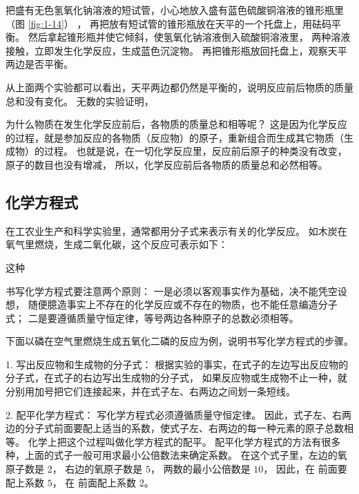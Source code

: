 \begin{shiyan}
    把盛有无色氢氧化钠溶液的短试管，小心地放入盛有蓝色硫酸铜溶液的锥形瓶里（图 \ref{fig:1-14}） ，
    再把放有短试管的锥形瓶放在天平的一个托盘上，用砝码平衡。
    然后拿起锥形瓶并使它倾斜，使氢氧化钠溶液倒入硫酸铜溶液里，
    两种溶液接触，立即发生化学反应，生成蓝色沉淀物。
    再把锥形瓶放回托盘上，观察天平两边是否平衡。
\end{shiyan}

从上面两个实验都可以看出，天平两边都仍然是平衡的，说明反应前后物质的质量总和没有变化。
无数的实验证明，

为什么物质在发生化学反应前后，各物质的质量总和相等呢？
这是因为化学反应的过程，就是参加反应的各物质（反应物）的原子，重新组合而生成其它物质（生成物）的过程。
也就是说，在一切化学反应里，反应前后原子的种类没有改变，原子的数目也没有增减，
所以，化学反应前后各物质的质量总和必然相等。


\subsection{化学方程式}

在工农业生产和科学实验里，通常都用分子式来表示有关的化学反应。
如木炭在氧气里燃烧，生成二氧化碳，这个反应可表示如下：
\begin{fangchengshi}
\end{fangchengshi}

这种

书写化学方程式要注意两个原则：
一是必须以客观事实作为基础，决不能凭空设想，
随便臆造事实上不存在的化学反应或不存在的物质，也不能任意编造分子式；
二是要遵循质量守恒定律，等号两边各种原子的总数必须相等。

下面以磷在空气里燃烧生成五氧化二磷的反应为例，说明书写化学方程式的步骤。

1. 写出反应物和生成物的分子式：
根据实验的事实，在式子的左边写出反应物的分子式，在式子的右边写出生成物的分子式，
如果反应物或生成物不止一种，就分别用加号把它们连接起来，并在式子左、右两边之间划一条短线。
\begin{fangchengshi}
\end{fangchengshi}

2. 配平化学方程式：
写化学方程式必须遵循质量守恒定律。
因此，式子左、右两边的分子式前面要配上适当的系数，使式子左、右两边的每一种元素的原子总数相等。
化学上把这个过程叫做化学方程式的配平。
配平化学方程式的方法有很多种，上面的式子一般可用求最小公倍数法来确定系数。
在这个式子里，左边的氧原子数是 $2$， 右边的氧原子数是 $5$， 两数的最小公倍数是 $10$，
因此，在  前面要配上系数 $5$， 在  前面配上系数 $2$。
\begin{fangchengshi}
\end{fangchengshi}

